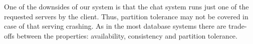 One of the downsides of our system is that the chat system runs just one of the requested servers by the client. Thus, partition tolerance may not be covered in case of that serving crashing. As in the most database systems there are trade-offs between the properties: availability, consistency and partition tolerance.


    


